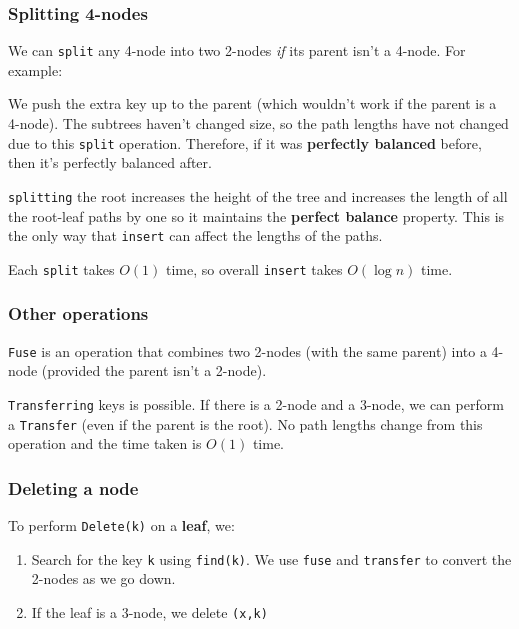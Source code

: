 \documentclass[11pt,a4paper,titlepage,dvipsnames,cmyk]{scrartcl}
\begin{document}
\subsubsection{Splitting 4-nodes}%
\label{ssub:split-4-nodes}
We can \lstinline|split| any 4-node into two 2-nodes \textit{if} its
parent isn't a 4-node. For example:


We push the extra key up to the parent (which wouldn't work if the parent
is a 4-node). The subtrees haven't changed size, so the path lengths have
not changed due to this \lstinline|split| operation. Therefore, if it was
\textbf{perfectly balanced} before, then it's perfectly balanced after.

\lstinline|splitting| the root increases the height of the tree and
increases the length of all the root-leaf paths by one so it maintains the
\textbf{perfect balance} property. This is the only way that
\lstinline|insert| can affect the lengths of the paths.

Each \lstinline|split| takes $O(1)$ time, so overall \lstinline|insert|
takes $O(\log n)$ time.

\subsubsection{Other operations}%
\label{ssub:other-ops}

\lstinline|Fuse| is an operation that combines two 2-nodes (with the same
parent) into a 4-node (provided the parent isn't a 2-node).

\lstinline|Transferring| keys is possible. If there is a 2-node and a
3-node, we can perform a \lstinline|Transfer| (even if the parent is the
root). No path lengths change from this operation and the time taken is
$O(1)$ time.

\subsubsection{Deleting a node}%
\label{ssub:delete}
To perform \lstinline|Delete(k)| on a \textbf{leaf}, we:
\begin{enumerate}
    \item Search for the key \lstinline|k| using \lstinline|find(k)|. We
        use \lstinline|fuse| and \lstinline|transfer| to convert the
        2-nodes as we go down.
    \item If the leaf is a 3-node, we delete \lstinline|(x,k)|
\end{enumerate}
\end{document}
